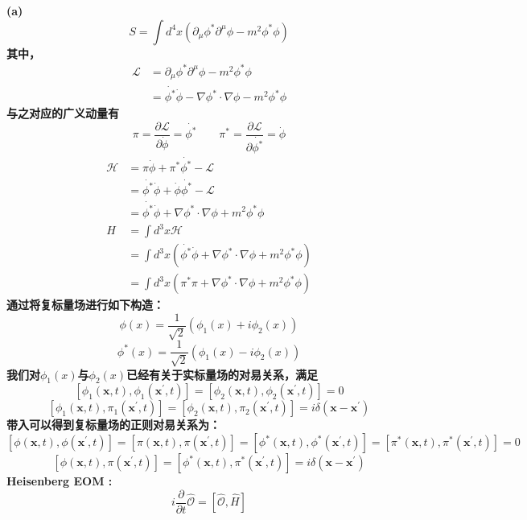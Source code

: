 \documentclass{article}
\begin{document}
\section{}
\bf{(a)}
$$S=\int d^4 x (\partial_{\mu} \phi^{*} \partial^{\mu} \phi - m^2 \phi^{*}\phi)$$
其中，
\begin{align}
\mathcal{L} &= \partial_{\mu} \phi^{*} \partial^{\mu} \phi - m^2 \phi^{*}\phi \nonumber \\
			&=\dot{\phi^{*}} \dot{\phi} - \nabla \phi^{*} \cdot \nabla \phi - m^2 \phi^{*}\phi \nonumber
\end{align}
与之对应的广义动量有
$$
\pi = \frac{\partial \mathcal{L}}{\partial \dot{\phi}} = \dot{\phi^{*}}
\qquad 
\pi^{*} = \frac{\partial \mathcal{L}}{\partial \dot{\phi^{*}}} = \dot{\phi}
$$
\begin{align}
\mathcal{H} &= \pi \dot{\phi} + \pi^{*} \dot{\phi^{*}} - \mathcal{L} \nonumber \\
			&= \dot{\phi^{*}} \dot{\phi} + \dot{\phi} \dot{\phi^{*}} - \mathcal{L} \nonumber \\
			&= \dot{\phi^{*}} \dot{\phi} + \nabla \phi^{*} \cdot \nabla \phi + m^2 \phi^{*}\phi \nonumber \\
		H   &= \int d^3 x \mathcal{H} \nonumber \\
			&= \int d^3 x \left( \dot{\phi^{*}} \dot{\phi} + \nabla \phi^{*} \cdot \nabla \phi + m^2 \phi^{*}\phi \right) \nonumber \\
			&= \int d^3 x \left( \pi^{*} \pi+ \nabla \phi^{*} \cdot \nabla \phi + m^2 \phi^{*}\phi \right) \nonumber 
\end{align}
通过将复标量场进行如下构造：
$$\phi(x) = \frac{1}{\sqrt{2}} (\phi_1(x) + i \phi_2(x))$$
$$\phi^{*}(x) = \frac{1}{\sqrt{2}} (\phi_1(x) - i \phi_2(x))$$
我们对$\phi_1(x)$与$\phi_2(x)$已经有关于实标量场的对易关系，满足 \\
$$
[\phi_{1}(\mathbf{x},t), \phi_{1}(\mathbf{x^{\prime}},t)] = [\phi_{2}(\mathbf{x},t), \phi_{2}(\mathbf{x^{\prime}},t)]=0 
$$
$$
[\phi_{1}(\mathbf{x},t), \pi_{1}(\mathbf{x^{\prime}},t)] = [\phi_{2}(\mathbf{x},t), \pi_{2}(\mathbf{x^{\prime}},t)] = i\delta(\mathbf{x} - \mathbf{x^{\prime}})
$$
带入可以得到复标量场的正则对易关系为：
$$
 [\phi(\mathbf{x},t), \phi(\mathbf{x^{\prime}},t)] = [\pi(\mathbf{x},t), \pi(\mathbf{x^{\prime}},t)] 
=[\phi^{*}(\mathbf{x},t), \phi^{*}(\mathbf{x^{\prime}},t)] = [\pi^{*}(\mathbf{x},t), \pi^{*}(\mathbf{x^{\prime}},t)] =0 
$$
$$
[\phi(\mathbf{x},t), \pi(\mathbf{x^{\prime}},t)] = [\phi^{*}(\mathbf{x},t), \pi^{*}(\mathbf{x^{\prime}},t)] = i\delta(\mathbf{x} - \mathbf{x^{\prime}})
$$
Heisenberg EOM : $$i \frac{\partial}{\partial t} \hat{\mathcal{O}}= \left[ \hat{\mathcal{O}},\hat{H} \right]$$
\end{document}
